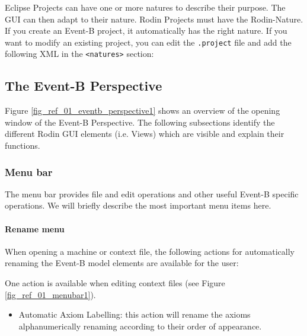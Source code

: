 Eclipse Projects can have one or more natures to describe their purpose.  The GUI can then adapt to their nature.  Rodin Projects must have the Rodin-Nature.  If you create an Event-B project, it automatically has the right nature.  If you want to modify an existing project, you can edit the \texttt{.project} file and add the following XML in the \texttt{<natures>} section:



\subsection{The Event-B Perspective}
\label{event_b_perspective}

Figure \ref{fig_ref_01_eventb_perspective1} shows an overview of the opening window of the Event-B Perspective. The following subsections identify the different Rodin GUI elements (i.e. Views) which are visible and explain their functions.


\subsubsection{Menu bar}
\label{menu_bar}

The menu bar provides file and edit operations and other useful Event-B specific operations. We will briefly describe the most important menu items here.

\paragraph{Rename menu}

When opening a machine or context file, the following actions for automatically renaming the Event-B model elements are available for the user:

One action is available when editing context files (see Figure \ref{fig_ref_01_menubar1}).

    \begin{itemize}
    	\item Automatic Axiom Labelling: this action will rename the axioms alphanumerically renaming according to their order of appearance. 
    \end{itemize}

